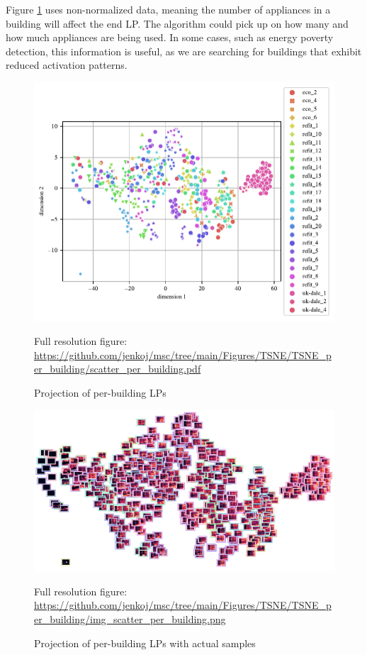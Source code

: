 Figure \ref{fig:tsne_scatter_non_norm_all} uses non-normalized data, meaning the number of appliances in a building will affect the end LP.
The algorithm could pick up on how many and how much appliances are being used.
In some cases, such as energy poverty detection, this information is useful, as we are searching for buildings that exhibit reduced activation patterns.

\begin{figure}[H]
	\centering
	\caption{Projection of per-building LPs}
	\includegraphics[]{Figures/TSNE/TSNE_per_building/scatter_per_building.pdf}
	\label{fig:tsne_scatter_non_norm_all}
	\par
	\par\footnotesize{Full resolution figure: \url{https://github.com/jenkoj/msc/tree/main/Figures/TSNE/TSNE_per_building/scatter_per_building.pdf}}
\end{figure}

\begin{figure}[H]
	\centering
	\caption{Projection of per-building LPs with actual samples}
	\includegraphics[width=.9\textwidth]{Figures/TSNE/TSNE_per_building/img_scatter_per_building.png}
	\label{fig:tsne_pb_img_scatter_allall}
	\par
	\par\footnotesize{Full resolution figure: \url{https://github.com/jenkoj/msc/tree/main/Figures/TSNE/TSNE_per_building/img_scatter_per_building.png}}
\end{figure}


